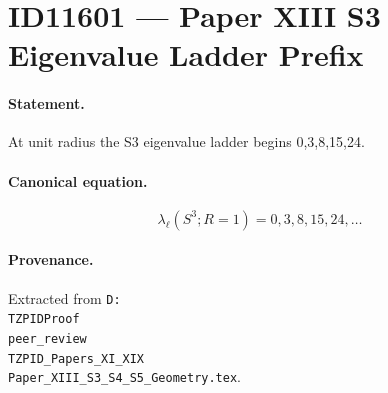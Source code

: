 \section*{ID11601 --- Paper XIII S3 Eigenvalue Ladder Prefix}

\paragraph{Statement.}
At unit radius the S3 eigenvalue ladder begins 0,3,8,15,24.

\paragraph{Canonical equation.}
\[
\lambda_\ell(S^3;R=1)=0,3,8,15,24,\ldots
\]

\paragraph{Provenance.}
Extracted from \texttt{D:\\TZPIDProof\\peer\_review\\TZPID\_Papers\_XI\_XIX\\Paper\_XIII\_S3\_S4\_S5\_Geometry.tex}.
